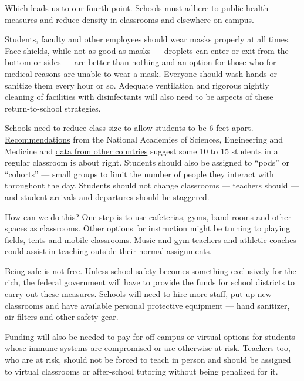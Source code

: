 Which leads us to our fourth point. Schools must adhere to public health
measures and reduce density in classrooms and elsewhere on campus.

Students, faculty and other employees should wear masks properly at all
times. Face shields, while not as good as masks --- droplets can enter
or exit from the bottom or sides --- are better than nothing and an
option for those who for medical reasons are unable to wear a mask.
Everyone should wash hands or sanitize them every hour or so. Adequate
ventilation and rigorous nightly cleaning of facilities with
disinfectants will also need to be aspects of these return-to-school
strategies.

Schools need to reduce class size to allow students to be 6 feet apart.
\href{https://www.nationalacademies.org/news/2020/07/schools-should-prioritize-reopening-in-fall-2020-especially-for-grades-k-5-while-weighing-risks-and-benefits}{Recommendations}
from the National Academies of Sciences, Engineering and Medicine and
\href{https://www.sciencemag.org/news/2020/07/school-openings-across-globe-suggest-ways-keep-coronavirus-bay-despite-outbreaks}{data
from other countries} suggest some 10 to 15 students in a regular
classroom is about right. Students should also be assigned to ``pods''
or ``cohorts'' --- small groups to limit the number of people they
interact with throughout the day. Students should not change classrooms
--- teachers should --- and student arrivals and departures should be
staggered.

How can we do this? One step is to use cafeterias, gyms, band rooms and
other spaces as classrooms. Other options for instruction might be
turning to playing fields, tents and mobile classrooms. Music and gym
teachers and athletic coaches could assist in teaching outside their
normal assignments.

Being safe is not free. Unless school safety becomes something
exclusively for the rich, the federal government will have to provide
the funds for school districts to carry out these measures. Schools will
need to hire more staff, put up new classrooms and have available
personal protective equipment --- hand sanitizer, air filters and other
safety gear.

Funding will also be needed to pay for off-campus or virtual options for
students whose immune systems are compromised or are otherwise at risk.
Teachers too, who are at risk, should not be forced to teach in person
and should be assigned to virtual classrooms or after-school tutoring
without being penalized for it.

